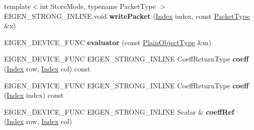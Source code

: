 \begin{DoxyCompactItemize}
{\footnotesize template$<$int Store\+Mode, typename Packet\+Type $>$ }\\E\+I\+G\+E\+N\+\_\+\+S\+T\+R\+O\+N\+G\+\_\+\+I\+N\+L\+I\+NE void {\bfseries write\+Packet} (\hyperlink{namespace_eigen_a62e77e0933482dafde8fe197d9a2cfde}{Index} index, const \hyperlink{struct_eigen_1_1_packet_type}{Packet\+Type} \&x)
\item 
\mbox{\label{struct_eigen_1_1internal_1_1evaluator_3_01_plain_object_base_3_01_derived_01_4_01_4_a39ce58da2063ef56c2e8c232edd6dbb2}} 
E\+I\+G\+E\+N\+\_\+\+D\+E\+V\+I\+C\+E\+\_\+\+F\+U\+NC {\bfseries evaluator} (const \hyperlink{class_eigen_1_1_plain_object_base}{Plain\+Object\+Type} \&m)
\item 
\mbox{\label{struct_eigen_1_1internal_1_1evaluator_3_01_plain_object_base_3_01_derived_01_4_01_4_a4d48e48a68b15c30177dd495409e95c3}} 
E\+I\+G\+E\+N\+\_\+\+D\+E\+V\+I\+C\+E\+\_\+\+F\+U\+NC E\+I\+G\+E\+N\+\_\+\+S\+T\+R\+O\+N\+G\+\_\+\+I\+N\+L\+I\+NE Coeff\+Return\+Type {\bfseries coeff} (\hyperlink{namespace_eigen_a62e77e0933482dafde8fe197d9a2cfde}{Index} row, \hyperlink{namespace_eigen_a62e77e0933482dafde8fe197d9a2cfde}{Index} col) const
\item 
\mbox{\label{struct_eigen_1_1internal_1_1evaluator_3_01_plain_object_base_3_01_derived_01_4_01_4_aaa358a51466994e46c685ce03bd0ab3c}} 
E\+I\+G\+E\+N\+\_\+\+D\+E\+V\+I\+C\+E\+\_\+\+F\+U\+NC E\+I\+G\+E\+N\+\_\+\+S\+T\+R\+O\+N\+G\+\_\+\+I\+N\+L\+I\+NE Coeff\+Return\+Type {\bfseries coeff} (\hyperlink{namespace_eigen_a62e77e0933482dafde8fe197d9a2cfde}{Index} index) const
\item 
\mbox{\label{struct_eigen_1_1internal_1_1evaluator_3_01_plain_object_base_3_01_derived_01_4_01_4_a80c4c10d826dce2a6db0661d82c8edb4}} 
E\+I\+G\+E\+N\+\_\+\+D\+E\+V\+I\+C\+E\+\_\+\+F\+U\+NC E\+I\+G\+E\+N\+\_\+\+S\+T\+R\+O\+N\+G\+\_\+\+I\+N\+L\+I\+NE Scalar \& {\bfseries coeff\+Ref} (\hyperlink{namespace_eigen_a62e77e0933482dafde8fe197d9a2cfde}{Index} row, \hyperlink{namespace_eigen_a62e77e0933482dafde8fe197d9a2cfde}{Index} col)
\item 

\end{DoxyCompactItemize}
